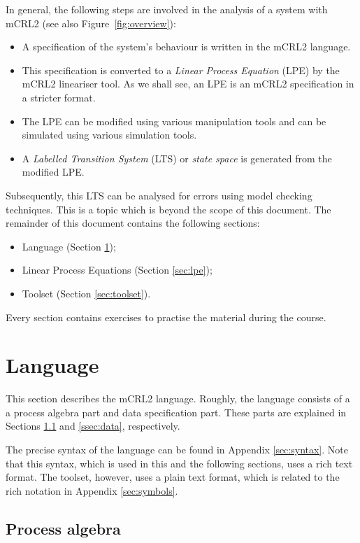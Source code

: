 \documentclass[a4paper,fleqn]{article}
\begin{document}
In general, the following steps are involved in the analysis of a system with
mCRL2 (see also Figure~\ref{fig:overview}):
\begin{itemize}
  \item A specification of the system's behaviour is written in the mCRL2
    language.
  \item This specification is converted to a \emph{Linear Process Equation}
    (LPE) by the mCRL2 lineariser tool. As we shall see, an LPE is an
    mCRL2 specification in a stricter format.
  \item The LPE can be modified using various manipulation tools and can be
    simulated using various simulation tools.
  \item A \emph{Labelled Transition System} (LTS) or \emph{state space} is
    generated from the modified LPE.
\end{itemize}

\noindent Subsequently, this LTS can be analysed for errors using model
checking techniques. This is a topic which is beyond the scope of this
document. The remainder of this document contains the following sections:
\begin{itemize}
  \item Language (Section \ref{sec:language});
  \item Linear Process Equations (Section \ref{sec:lpe});
  \item Toolset (Section \ref{sec:toolset}).
\end{itemize}

\noindent Every section contains exercises to practise the material during the
course. 

\section{Language}
\label{sec:language}

This section describes the mCRL2 language. Roughly, the language consists of a
a process algebra part and data specification part. These parts are explained
in Sections \ref{ssec:process algebra} and \ref{ssec:data}, respectively.

The precise syntax of the language can be found in Appendix \ref{sec:syntax}.
Note that this syntax, which is used in this and the following sections, uses a
rich text format. The toolset, however, uses a plain text format, which is
related to the rich notation in Appendix \ref{sec:symbols}.

\subsection{Process algebra}
\label{ssec:process algebra}
\end{document}
